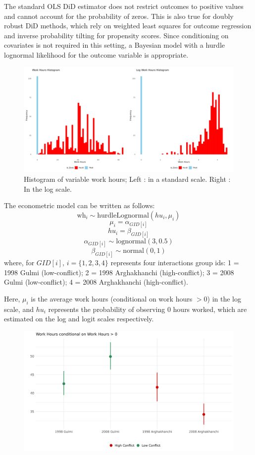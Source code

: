 \documentclass[12pt,a4paper]{article}
\begin{document}
The standard OLS DiD estimator does not restrict outcomes to positive values and cannot account for the probability of zeros. This is also true for doubly robust DiD methods, which rely on weighted least squares for outcome regression and inverse probability tilting for propensity scores. Since conditioning on covariates is not required in this setting, a Bayesian model with a hurdle lognormal likelihood for the outcome variable is appropriate.

\begin{figure}[H]
	\centering
	\includegraphics[width=1\textwidth]{../Analysis files/wh_histogram.jpg}
	\caption{Histogram of variable work hours; Left : in a standard scale. Right : In the log scale.}
	\label{fig:wh_histogram}
\end{figure}

The econometric model can be written as follows:
$$\text{wh}_{i} \sim \text{hurdleLognormal}(hu_i, \mu_i)$$
$$\mu_{i} = \alpha_{GID[i]}$$
$$hu_{i} = \beta_{GID[i]}$$
$$\alpha_{GID[i]} \sim \text{lognormal}(3, 0.5)$$
$$\beta_{GID[i]} \sim \text{normal}(0, 1)$$
where, for $GID[i]$, $i = \{ 1, 2, 3, 4\}$ represents four interactions group ids: 1 = 1998 Gulmi (low-conflict); 2 = 1998 Arghakhanchi (high-conflict); 3 = 2008 Gulmi (low-conflict); 4 = 2008 Arghakhanchi (high-conflict).

Here, $\mu_i$ is the average work hours (conditional on work hours $> 0$) in the log scale, and $hu_i$ represents the probability of observing $0$ hours worked, which are estimated on the log and logit scales respectively.






\begin{figure}[H]
	\centering
	\includegraphics[width=1\textwidth]{../Analysis files/coefplot_map.jpg}
	\caption{}
	\label{fig:coefplot_map}
\end{figure}
\end{document}

